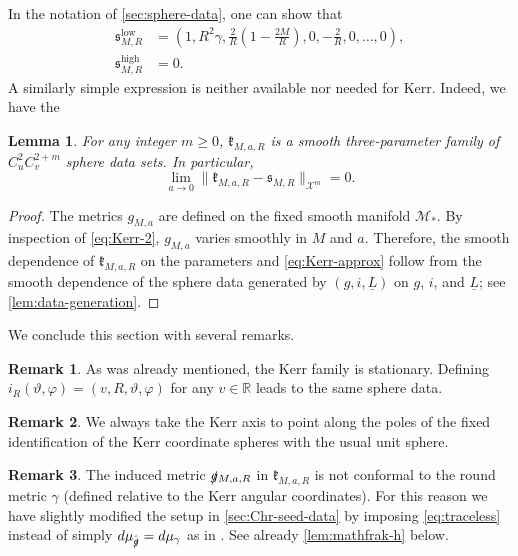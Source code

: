 \documentclass[10pt]{article}
\numberwithin{equation}{section}
\theoremstyle{plain}
\newtheorem{lem}{Lemma}[section]
\theoremstyle{definition}
\newtheorem{rk}{Remark}[section]
\renewcommand{\Bbb}{\mathbb}
\begin{document}
In the notation of \cref{sec:sphere-data}, one can show that
    \begin{align}
        {\mathfrak s}_{M,R}^\mathrm{low}&= \left(1,R^2\gamma,\frac{2}{R}\left(1-\frac{2M}{R}\right),0,-\frac{2}{R},0,\dotsc,0\right), \label{eq:Schw-sphere-data}\\
        {\mathfrak s}_{M,R}^\mathrm{high}&= 0\label{eq:Schw-sphere-data-high}.
    \end{align}
    A similarly simple expression is neither available nor needed for Kerr. Indeed, we have the 
    \begin{lem}
For any integer $m\ge 0$, $\mathfrak k_{M,a,R}$ is a smooth three-parameter family of $C^2_uC^{2+m}_v$ sphere data sets. In particular,
            \begin{equation}
   \lim_{a\to 0} \|\mathfrak k_{M,a,R}-\mathfrak s_{M,R}\|_{\mathcal X^m} =0.\label{eq:Kerr-approx}
\end{equation}
    \end{lem}
    \begin{proof}
        The metrics $g_{M,a}$ are defined on the fixed smooth manifold $\mathcal M_*$. By inspection of \eqref{eq:Kerr-2}, $g_{M,a}$ varies smoothly in $M$ and $a$. Therefore, the smooth dependence of $\mathfrak k_{M,a,R}$ on the parameters and \eqref{eq:Kerr-approx} follow from the smooth dependence of the sphere data generated by $(g,i,\underline L)$ on $g$, $i$, and $\underline L$; see \cref{lem:data-generation}. 
    \end{proof}

We conclude this section with several remarks.

\begin{rk}
   As was already mentioned, the Kerr family is stationary. Defining $i_R(\vartheta,\varphi)=(v,R,\vartheta,\varphi)$ for any $v\in\Bbb R$ leads to the same sphere data. 
\end{rk}

\begin{rk}
    We always take the Kerr axis to point along the poles of the fixed identification of the Kerr coordinate spheres with the usual unit sphere. 
\end{rk}

\begin{rk}
    \label{rk:BL-conformal-factor} The induced metric $\slashed g{}_{M,a,R}$ in $\mathfrak k_{M,a,R}$ is not conformal to the round metric $\gamma$ (defined relative to the Kerr angular coordinates). For this reason we have slightly modified the setup in \cref{sec:Chr-seed-data} by imposing \eqref{eq:traceless} instead of simply $d\mu_{\hat{\slashed g}}=d\mu_\gamma$ as in \cite[Chapter 2]{Christo09}. See already \cref{lem:mathfrak-h} below. 
\end{rk}
\end{document}

